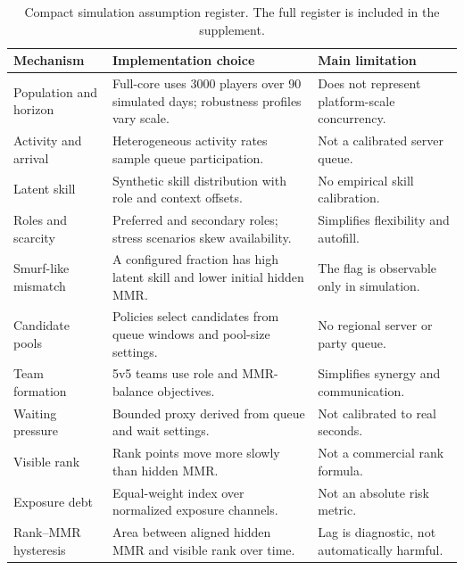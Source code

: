 \begin{table}[t]
\centering
\small
\caption{Compact simulation assumption register. The full register is included in the supplement.}
\label{tab:assumptions}
\setlength{\tabcolsep}{4pt}
\begin{tabularx}{\textwidth}{p{}X X}
\toprule
Mechanism & Implementation choice & Main limitation \\
\midrule
Population and horizon & Full-core uses 3000 players over 90 simulated days; robustness profiles vary scale. & Does not represent platform-scale concurrency. \\
Activity and arrival & Heterogeneous activity rates sample queue participation. & Not a calibrated server queue. \\
Latent skill & Synthetic skill distribution with role and context offsets. & No empirical skill calibration. \\
Roles and scarcity & Preferred and secondary roles; stress scenarios skew availability. & Simplifies flexibility and autofill. \\
Smurf-like mismatch & A configured fraction has high latent skill and lower initial hidden MMR. & The flag is observable only in simulation. \\
Candidate pools & Policies select candidates from queue windows and pool-size settings. & No regional server or party queue. \\
Team formation & 5v5 teams use role and MMR-balance objectives. & Simplifies synergy and communication. \\
Waiting pressure & Bounded proxy derived from queue and wait settings. & Not calibrated to real seconds. \\
Visible rank & Rank points move more slowly than hidden MMR. & Not a commercial rank formula. \\
Exposure debt & Equal-weight index over normalized exposure channels. & Not an absolute risk metric. \\
Rank--MMR hysteresis & Area between aligned hidden MMR and visible rank over time. & Lag is diagnostic, not automatically harmful. \\
\bottomrule
\end{tabularx}
\end{table}
